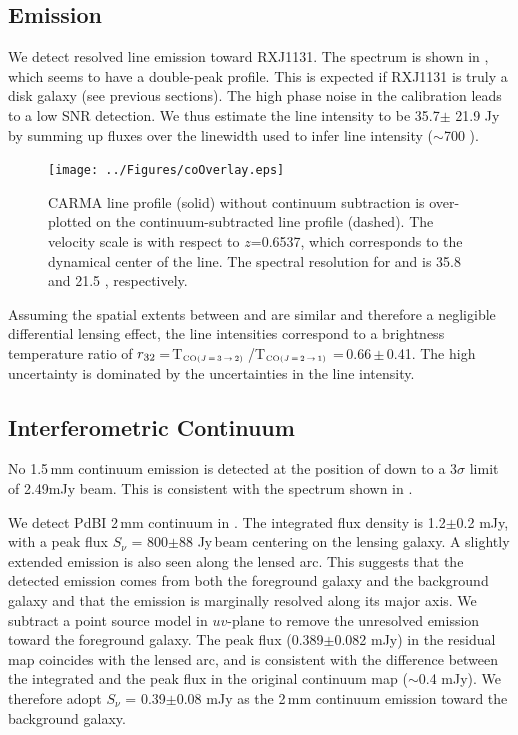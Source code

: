 \documentclass[]{emulateapj}
\begin{document}
\subsection{\cco Emission} %
We detect resolved \cco line emission toward RXJ1131. The spectrum is shown in
, which seems to have a double-peak profile.
This is expected if RXJ1131 is truly a disk galaxy (see previous
sections). The high phase noise in the calibration leads to a low SNR
detection. We thus estimate the line intensity to be
35.7$\pm$ 21.9 Jy\,\kms by summing up fluxes over the
linewidth used to infer \bco line intensity ($\sim$700 \kms).

\begin{figure}[!Htbp]
\centering
\texttt{[image: ../Figures/coOverlay.eps]}
\caption{CARMA \cco line profile (solid) without continuum subtraction is
over-plotted on the continuum-subtracted \bco line profile (dashed).
The velocity scale is with respect to $z$=0.6537, which corresponds to the
dynamical center of the \bco line. The spectral resolution for \cco and \bco
is 35.8 \kms and 21.5 \kms, respectively.
 \label{fig:co32spec}}
\end{figure}

Assuming the spatial extents between \bco and \cco are similar and therefore
a negligible differential lensing effect, the line intensities
correspond to a brightness temperature ratio of
$r_{\rm 32}$\,=\,T$_{\tiny \mbox{CO($J$\,=\,3\,$\rightarrow$\,2) }}$/T$_{\tiny \mbox{CO($J$\,=\,2\,$\rightarrow$\,1) }}$\,=\,0.66\,$\pm$\,0.41.
The high uncertainty is dominated by the uncertainties in the \cco line
intensity.

\subsection{Interferometric Continuum} %
No 1.5\,mm continuum emission is detected at the position of \cco
down to a 3$\sigma$ limit of 2.49mJy beam\pmOne.
This is consistent with the spectrum shown in .

We detect PdBI 2\,mm continuum in . The integrated flux density is
1.2$\pm$0.2 mJy, with a peak flux $S_\nu$ = 800$\pm$88 \micron Jy\,beam\pmOne
centering on the lensing galaxy. A slightly extended emission is also seen
along the lensed arc. This suggests that the detected emission comes from
both the foreground galaxy and the background galaxy and that the
emission is marginally resolved along its major axis.
We subtract a point source model in $uv$-plane to remove the unresolved
emission toward the foreground galaxy. The peak flux (0.389$\pm$0.082 mJy)
in the residual map coincides with the lensed arc, and is consistent with
the difference between the integrated and the peak flux in the
original continuum map ($\sim$0.4 mJy). We therefore adopt
$S_\nu$ = 0.39$\pm$0.08 mJy as the 2\,mm continuum emission toward
the background galaxy.
\end{document}
